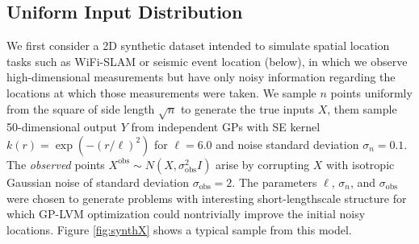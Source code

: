 \documentclass{article}
\begin{document}
\subsection{Uniform Input Distribution}
\vspace{-.2cm}
We first consider a 2D synthetic dataset intended to simulate spatial location tasks such as WiFi-SLAM
\cite{ferris2007wifi} or seismic event location (below), in which we
observe high-dimensional measurements but have only noisy information
regarding the locations at which those measurements were
taken. We sample $n$ points uniformly from the square of side length
$\sqrt{n}$ to generate the true inputs $X$, them sample 50-dimensional output $Y$ from independent GPs
with SE kernel $k(r) = \exp(-(r/\ell)^2)$ for $\ell=6.0$ and noise standard deviation
$\sigma_n = 0.1$. The {\em observed} points
$X^\text{obs} \sim N(X, \sigma^2_\text{obs}I)$ arise by corrupting $X$ with
isotropic Gaussian noise of standard deviation
$\sigma_\text{obs}=2$. The parameters $\ell$, $\sigma_n$, and
$\sigma_\text{obs}$ were chosen to generate problems with
interesting short-lengthscale structure for which
GP-LVM optimization could nontrivially improve the initial noisy locations. Figure \ref{fig:synthX} shows a typical sample from this model.
\end{document}
